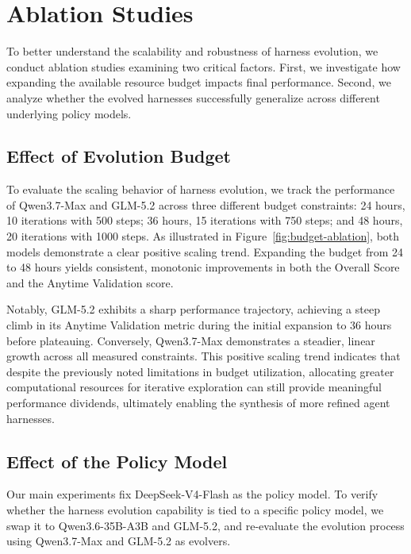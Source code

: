 \section{Ablation Studies}
\label{sec:ablation-studies}

To better understand the scalability and robustness of harness evolution, we conduct ablation studies examining two critical factors. 
First, we investigate how expanding the available resource budget impacts final performance. Second, we analyze whether the evolved harnesses successfully generalize across different underlying policy models. 

\subsection{Effect of Evolution Budget}

To evaluate the scaling behavior of harness evolution, we track the performance of Qwen3.7-Max and GLM-5.2 across three different budget constraints: 24 hours, 10 iterations with 500 steps; 36 hours, 15 iterations with 750 steps; and 48 hours, 20 iterations with 1000 steps. As illustrated in Figure~\ref{fig:budget-ablation}, both models demonstrate a clear positive scaling trend. Expanding the budget from 24 to 48 hours yields consistent, monotonic improvements in both the Overall Score and the Anytime Validation score.

Notably, GLM-5.2 exhibits a sharp performance trajectory, achieving a steep climb in its Anytime Validation metric during the initial expansion to 36 hours before plateauing. Conversely, Qwen3.7-Max demonstrates a steadier, linear growth across all measured constraints. This positive scaling trend indicates that despite the previously noted limitations in budget utilization, allocating greater computational resources for iterative exploration can still provide meaningful performance dividends, ultimately enabling the synthesis of more refined agent harnesses.

\subsection{Effect of the Policy Model}

Our main experiments fix DeepSeek-V4-Flash as the policy model. To verify whether the harness evolution capability is tied to a specific policy model, we swap it to Qwen3.6-35B-A3B and GLM-5.2, and re-evaluate the evolution process using Qwen3.7-Max and GLM-5.2 as evolvers. 

